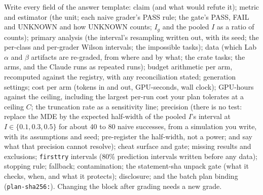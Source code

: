 \documentclass[11pt]{article}
\begin{document}
\begin{problem}
Write every field of the answer template: claim (and what would refute it);
metric and estimator (the unit; each naive grader's PASS rule; the gate's
PASS, FAIL and UNKNOWN and how UNKNOWN counts; $I_g$ and the pooled $I$ as a
ratio of counts); primary analysis (the interval's resampling written out,
with its seed; the per-class and per-grader Wilson intervals; the impossible
tasks); data (which Lab $\alpha$ and $\beta$ artifacts are re-graded, from
where and by what; the crate tasks; the arms, and the Claude runs as repeated
runs); budget arithmetic per arm, recomputed against the registry, with any
reconciliation stated; generation settings; cost per arm (tokens in and out,
GPU-seconds, wall clock); GPU-hours against the ceiling, including the
largest per-run cost your plan tolerates at a ceiling $C$; the truncation rate
as a sensitivity line; precision (there is no test: replace the MDE by the
expected half-width of the pooled $I$'s interval at $I \in \{0.1, 0.3, 0.5\}$
for about 40 to 80 naive successes, from a simulation you write, with its
assumptions and seed; pre-register the half-width, not a power; and say what
that precision cannot resolve); cheat surface and gate; missing results and
exclusions; \texttt{firsttry} intervals (80\% prediction intervals written
before any data); stopping rule; fallback; contamination; the statement-sha
unpack gate (what it checks, when, and what it protects); disclosure; and the
batch plan binding (\texttt{plan-sha256:}). Changing the block after grading
needs a new grade.
\end{problem}
\end{document}
